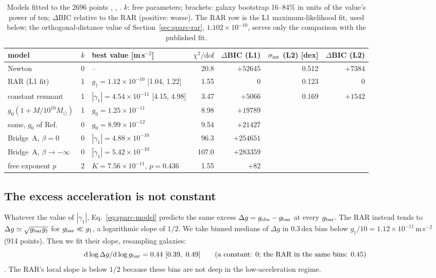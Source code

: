 \begin{table}[!t]
\centering\footnotesize
\caption{Models fitted to the 2696 points , , . $k$: free parameters; brackets: galaxy
bootstrap 16--84\% in units of the value's power of ten; $\Delta$BIC relative to the RAR (positive: worse). The RAR row is the L1
maximum-likelihood fit, used below; the orthogonal-distance value of Section~\ref{sec:sparc-rar}, $1.102\times10^{-10}$, serves only the
comparison with the published fit.}
\label{tab:sparc-models}
\setlength{\tabcolsep}{4pt}
\begin{tabular}{@{}lclrrrr@{}}
\toprule
model & $k$ & best value [m\,s$^{-2}$] & $\chi^2/\mathrm{dof}$ & $\Delta$BIC (L1) & $\sigma_{\rm int}$ (L2) [dex] & $\Delta$BIC (L2)\\
\midrule
Newton & 0 & -- & 20.8 & $+52645$ & 0.512 & $+7384$\\
RAR (L1 fit) & 1 & $g_\dagger=1.12\times10^{-10}$ [1.04, 1.22] & 1.55 & 0 & 0.123 & 0\\
constant remnant & 1 & $|\gamma_1|=4.54\times10^{-11}$ [4.15, 4.98] & 3.47 & $+5066$ & 0.169 & $+1542$\\
$g_0(1+M/10^{10}M_\odot)$ & 1 & $g_0=1.25\times10^{-11}$ & 8.98 & $+19789$ & & \\
same, $g_0$ of Ref.~\cite{oppenheimrusso} & 0 & $g_0=8.99\times10^{-12}$ & 9.54 & $+21427$ & & \\
Bridge~A, $\beta=0$ & 0 & $|\gamma_1|=4.88\times10^{-10}$ & 96.3 & $+254651$ & & \\
Bridge~A, $\beta\to-\infty$ & 0 & $|\gamma_1|=5.42\times10^{-10}$ & 107.0 & $+283359$ & & \\
free exponent $p$ & 2 & $K=7.56\times10^{-11}$, $p=0.436$ & 1.55 & $+82$ & & \\
\bottomrule
\end{tabular}
\end{table}

\subsection{The excess acceleration is not constant}\label{sec:sparc-slope}

Whatever the value of $|\gamma_1|$, Eq.~\eqref{eq:sparc-model} predicts the same excess $\Delta g=g_{\rm obs}-g_{\rm bar}$ at every
$g_{\rm bar}$. The RAR instead tends to $\Delta g\simeq\sqrt{g_{\rm bar}g_\dagger}$ for $g_{\rm bar}\ll g_\dagger$, a logarithmic slope of
$1/2$. We take binned medians of $\Delta g$ in 0.3\,dex bins below $g_\dagger/10=1.12\times10^{-11}$\,m\,s$^{-2}$ (914 points). Then we
fit their slope, resampling galaxies:
\begin{equation}\label{eq:sparc-slope}
\mathrm{d}\log\Delta g/\mathrm{d}\log g_{\rm bar}=0.44\ [0.39,\ 0.49]\qquad\text{(a constant: 0; the RAR in the same bins: 0.45)}
\end{equation}
. The RAR's local slope is below $1/2$ because these bins are not deep in the low-acceleration regime.

